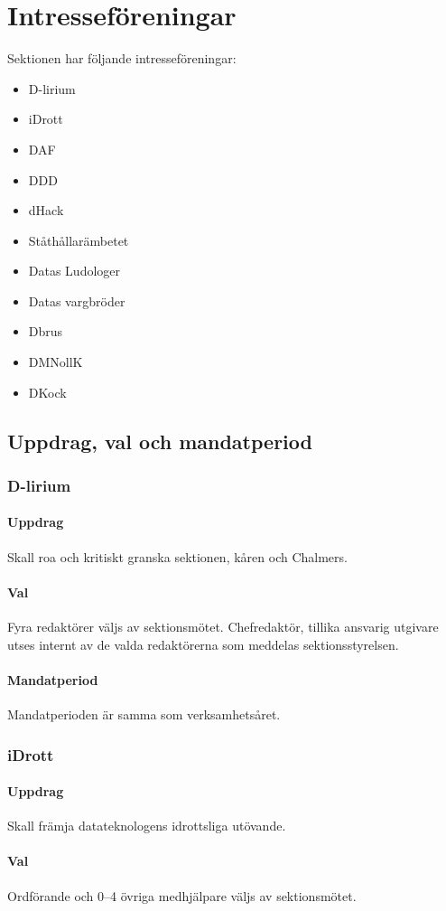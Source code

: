 \section{Intresseföreningar}
Sektionen har följande intresseföreningar:
\begin{itemize}
  \item D-lirium 
  \item iDrott 
  \item DAF 
  \item DDD
  \item dHack
  \item Ståthållarämbetet
  \item Datas Ludologer 
  \item Datas vargbröder
  \item Dbrus
  \item DMNollK
  \item DKock
\end{itemize}
\subsection{Uppdrag, val och mandatperiod}
\subsubsection{D-lirium}
\paragraph{Uppdrag}
Skall roa och kritiskt granska sektionen, kåren och Chalmers. 
\paragraph{Val}
Fyra redaktörer väljs av sektionsmötet. Chefredaktör, tillika ansvarig utgivare utses internt av de valda redaktörerna som meddelas sektionsstyrelsen. 
\paragraph{Mandatperiod}
Mandatperioden är samma som verksamhetsåret. 
\subsubsection{iDrott}
\paragraph{Uppdrag}
Skall främja datateknologens idrottsliga utövande. 
\paragraph{Val}
Ordförande och 0--4 övriga medhjälpare väljs av sektionsmötet. 
